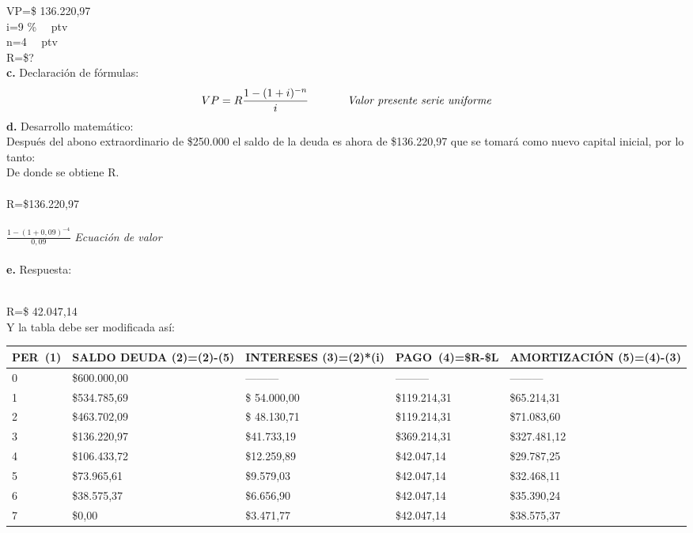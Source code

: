 	VP=\$ 136.220,97\\
	i=9 \% \ \ ptv\\
	n=4 \ \ ptv\\
	R=\$?\\


\textbf{c.} Declaración de fórmulas:
\begin{align*}
	VP=R \frac{1-(1+i)^{-n}}{i} \hspace{35 pt} \textit{Valor presente serie uniforme}\\
\end{align*}
\textbf{d.} Desarrollo matemático:\\

Después del abono extraordinario de \$250.000 el saldo de la deuda es ahora de \$136.220,97 que se tomará como nuevo capital inicial, por lo tanto:\\
De donde se obtiene R.\\\\
R=\$136.220,97\\\\ $\frac{1-(1+0,09)^{-4}}{0,09}$ \hspace{35 pt} \textit{Ecuación de valor}\\\\
\textbf{e.} Respuesta: \\\

	R=\$ 42.047,14\\

Y la tabla debe ser modificada así:

\begin{spacing}{1.1}
    \begin{center}
        \begin{tabular}{|p{1cm}|p{2cm}|p{2cm}|p{2cm}|p{3cm}|}
        \hline 
        \rowcolor{white!50}
            \textbf{PER\ (1)} & \textbf{SALDO DEUDA (2)=(2)-(5)} & \textbf{INTERESES  (3)=(2)*(i)}& \textbf{PAGO\ (4)=\$R-\$L }& \textbf{AMORTIZACIÓN  (5)=(4)-(3)} \\ \hline                        

            0 & \$600.000,00 & --------- & --------- & ---------\\ \hline 
            1 & \$534.785,69  &\$ 54.000,00  & \$119.214,31  & \$65.214,31 \\ \hline
            2 & \$463.702,09  &\$ 48.130,71  & \$119.214,31  & \$71.083,60 \\ \hline
            3 & \$136.220,97 & \$41.733,19  & \$369.214,31 & \$327.481,12 \\ \hline
            4 & \$106.433,72  & \$12.259,89  & \$42.047,14  & \$29.787,25\\ \hline
            5 & \$73.965,61  & \$9.579,03  & \$42.047,14  & \$32.468,11 \\ \hline
            6 & \$38.575,37  & \$6.656,90  & \$42.047,14  & \$35.390,24 \\ \hline
            7 & \$0,00  & \$3.471,77  & \$42.047,14  & \$38.575,37 \\ \hline

 
\end{tabular}
\end{center}
\end{spacing}


